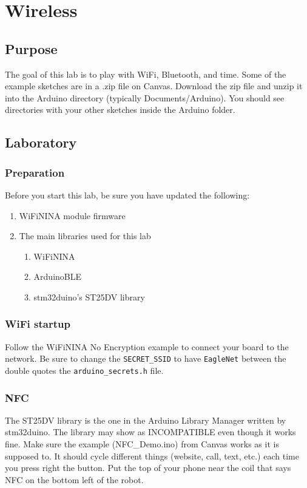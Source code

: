 \chapter{Wireless}

\section{Purpose}
The goal of this lab is to play with WiFi, Bluetooth, and time. Some of the example
sketches are in a .zip file on Canvas. Download the zip file and unzip it into the 
Arduino directory (typically Documents/Arduino). You should see directories with 
your other sketches inside the Arduino folder.

\section{Laboratory}
\subsection{Preparation}
Before you start this lab, be sure you have updated the following:
\begin{enumerate}
    \item WiFiNINA module firmware
    \item The main libraries used for this lab 
    \begin{enumerate}
        \item WiFiNINA
        \item ArduinoBLE
        \item stm32duino's ST25DV library
    \end{enumerate}
\end{enumerate}

\subsection{WiFi startup}
Follow the WiFiNINA No Encryption example to connect your board to the network. Be 
sure to change the \lstinline|SECRET_SSID| to have \lstinline|EagleNet| between the 
double quotes the \lstinline|arduino_secrets.h| file.

\subsection{NFC}
The ST25DV library is the one in the Arduino Library Manager written by stm32duino.
The library may show as INCOMPATIBLE even though it works fine. Make sure the 
example (NFC\_Demo.ino) from Canvas works as it is supposed to. It should cycle 
different things (website, call, text, etc.) each time you press right the button. Put 
the top of your phone near the coil that says NFC on the bottom left of the robot.

